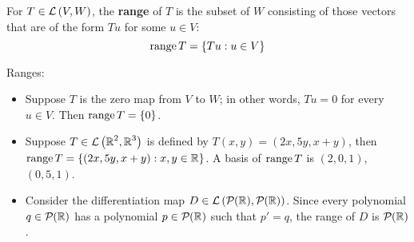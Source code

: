 \begin{definition} [Range]
   For $T \in \mathcal{L} \left( V, W \right)$, the \textbf{range} of $T$ is the subset
   of $W$ consisting of those vectors that are of the form $Tu$ for some $u \in V$:
   \[ \operatorname{range} T = \{ Tu : u \in V \} \]
\end{definition}

\begin{example} Ranges:
   \begin{itemize}
      \item Suppose $T$ is the zero map from $V$ to $W$; in other words,
      $Tu = 0$ for every $u \in V$. Then $\operatorname{range} T = \{ 0 \}$.
      \item Suppose $T \in \mathcal{L} \left( \operatorname{\mathbb{R}}^2, \operatorname{\mathbb{R}}^3 \right)$ is defined by $T(x,y) = (2x, 5y, x+y)$,
      then $\operatorname{range} T = \{ (2x, 5y, x+y) : x, y \in \operatorname{\mathbb{R}} \}$. A basis of $\operatorname{range}{T}$ is $(2, 0, 1)$, $(0, 5, 1)$.
      \item Consider the differentiation map $D \in \Lin{\Polys{\R}{\empty},\Polys{\R}{\empty}}$. Since every polynomial $q \in \Polys{\R}{\empty}$
      has a polynomial $p \in \Polys{\R}{\empty}$ such that $p' = q$, the range of $D$ is $\Polys{\R}{\empty}$.
   \end{itemize}
\end{example}
\endinput